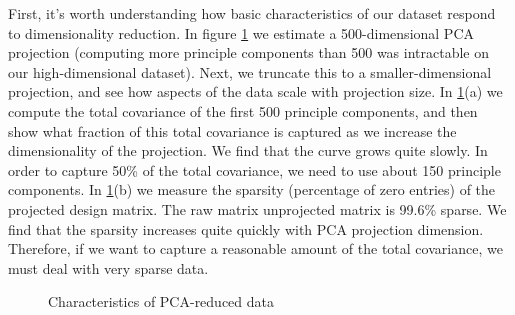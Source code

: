 \documentclass[]{article}
\begin{document}
First, it's worth understanding how basic characteristics of our dataset respond to dimensionality reduction.  In figure \ref{fig:PCA_RED} we estimate a 500-dimensional PCA projection (computing more principle components than 500 was intractable on our high-dimensional dataset). Next, we truncate this to a smaller-dimensional projection, and see how aspects of the data scale with projection size. In  \ref{fig:PCA_RED}(a) we compute the total covariance of the first 500 principle components, and then show what fraction of this total covariance is captured as we increase the dimensionality of the projection. We find that the curve grows quite slowly. In order to capture 50\% of the total covariance, we need to use about 150 principle components. In  \ref{fig:PCA_RED}(b) we measure the sparsity (percentage of zero entries) of the projected design matrix. The raw matrix unprojected matrix is 99.6\% sparse. We find that the sparsity increases quite quickly with PCA projection dimension. Therefore, if we want to capture a reasonable amount of the total covariance, we must deal with very sparse data. 

\begin{figure}[!ht]
\centering
{}
\caption{Characteristics of PCA-reduced data}
\label{fig:PCA_RED}
\end{figure}
\end{document}
